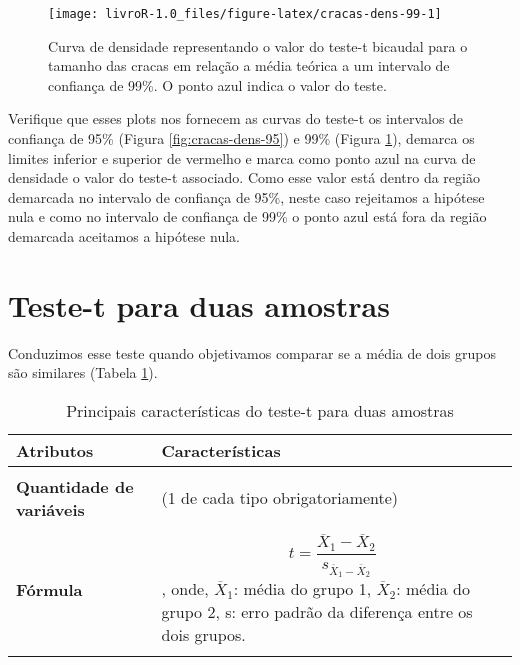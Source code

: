 \documentclass[14pt,titlepage, oneside, openany, a4paper]{book}
\begin{document}
\begin{figure}[H]

{\centering \texttt{[image: livroR-1.0\_files/figure-latex/cracas-dens-99-1]} 

}

\caption{Curva de densidade representando o valor do teste-t bicaudal para o tamanho das cracas em relação a média teórica a um intervalo de confiança de 99\%. O ponto azul indica o valor do teste.}\label{fig:cracas-dens-99}
\end{figure}

Verifique que esses plots nos fornecem as curvas do teste-t os intervalos de confiança de 95\% (Figura \ref{fig:cracas-dens-95}) e 99\% (Figura \ref{fig:cracas-dens-99}), demarca os limites inferior e superior de vermelho e marca como ponto azul na curva de densidade o valor do teste-t associado. Como esse valor está dentro da região demarcada no intervalo de confiança de 95\%, neste caso rejeitamos a hipótese nula e como no intervalo de confiança de 99\% o ponto azul está fora da região demarcada aceitamos a hipótese nula.

\hypertarget{teste-t-para-duas-amostras}{%
\section{Teste-t para duas amostras}\label{teste-t-para-duas-amostras}}

Conduzimos esse teste quando objetivamos comparar se a média de dois grupos são similares (Tabela \ref{tab:tab2t}).

\begin{table}

\caption{\label{tab:tab2t}Principais características do teste-t para duas amostras}
\centering
\begin{tabular}[c]{>{\raggedright\arraybackslash}p{10em}>{\raggedright\arraybackslash}p{30em}}
\toprule
Atributos & Características\\
\midrule
\textbf{\cellcolor{gray!6}{Tipo de variável}} & \cellcolor{gray!6}{Quantitativa e categórica}\\
\textbf{Quantidade de variáveis} & 2 (1 de cada tipo obrigatoriamente)\\
\textbf{\cellcolor{gray!6}{Hipótese nula}} & \cellcolor{gray!6}{A diferença na média da variável quantitativa dos grupos é igual a 0.}\\
\textbf{Fórmula} & $$t=\frac{\overline{X}_1-\overline{X}_2}{s_{\overline{X}_1-\overline{X}_2}}$$, onde, $\overline{X}_1$: média do grupo 1, $\overline{X}_2$: média do grupo 2, s: erro padrão da diferença entre os dois grupos.\\
\textbf{\cellcolor{gray!6}{Observação}} & \cellcolor{gray!6}{Não há a necessidade de post-hoc nem expressa-la graficamente.}\\
\bottomrule
\end{tabular}
\end{table}
\end{document}
